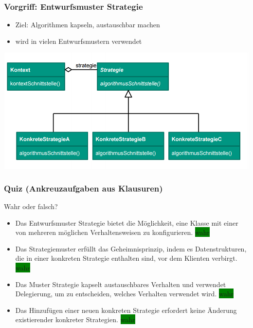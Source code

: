 \documentclass[18pt]{beamer}
\begin{document}
	\begin{frame}
		\frametitle{Vorgriff: Entwurfsmuster Strategie}
		\begin{itemize}
			\item Ziel: Algorithmen kapseln, austauschbar machen
			\item wird in vielen Entwurfsmustern verwendet
		\end{itemize}
		\includegraphics[scale=0.5]{./pics/tut3/strat.png}
	\end{frame}

	\begin{frame}
		\frametitle{Quiz (Ankreuzaufgaben aus Klausuren)}
		Wahr oder falsch?
		\begin{itemize}
			\item Das Entwurfsmuster Strategie bietet die Möglichkeit, eine Klasse mit einer von mehreren möglichen Verhaltensweisen zu konfigurieren. \pause \colorbox{green}{wahr} \pause
			\item Das Strategiemuster erfüllt das Geheimnisprinzip, indem es Datenstrukturen, die in einer konkreten Strategie enthalten sind, vor dem Klienten verbirgt. \pause \colorbox{green}{wahr} \pause
			\item Das Muster Strategie kapselt austauschbares Verhalten und verwendet Delegierung, um zu entscheiden, welches Verhalten verwendet wird. \pause \colorbox{green}{wahr} \pause 
			\item Das Hinzufügen einer neuen konkreten Strategie erfordert keine Änderung existierender konkreter Strategien. \pause \colorbox{green}{wahr}
		\end{itemize}
\end{frame}
\end{document}
